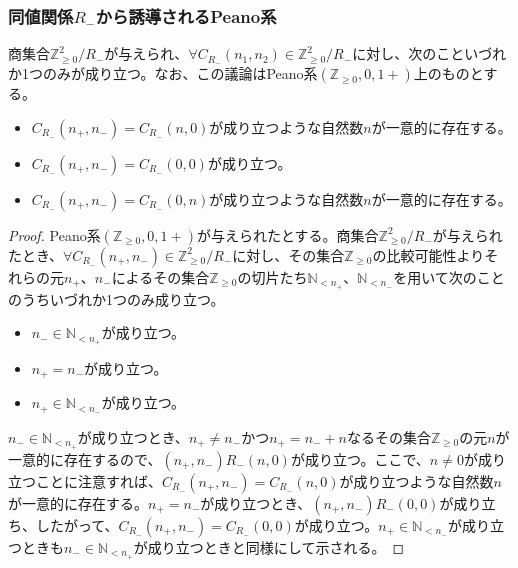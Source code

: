 \documentclass[dvipdfmx]{jsarticle}
\begin{document}
\subsubsection{同値関係$R_{-}$から誘導されるPeano系}%
\begin{thm}\label{1.2.6.2}
商集合$\mathbb{Z}_{\geq 0}^{2} /R_{-} $が与えられ、$\forall C_{R_{-}}\left( n_{1},n_{2} \right) \in \mathbb{Z}_{\geq 0}^{2} /R_{-} $に対し、次のこといづれか1つのみが成り立つ。なお、この議論はPeano系$\left( \mathbb{Z}_{\geq 0},0,1 + \right)$上のものとする。
\begin{itemize}
\item
  $C_{R_{-}}\left( n_{+},n_{-} \right) = C_{R_{-}}(n,0)$が成り立つような自然数$n$が一意的に存在する。
\item
  $C_{R_{-}}\left( n_{+},n_{-} \right) = C_{R_{-}}(0,0)$が成り立つ。
\item
  $C_{R_{-}}\left( n_{+},n_{-} \right) = C_{R_{-}}(0,n)$が成り立つような自然数$n$が一意的に存在する。
\end{itemize}
\end{thm}
\begin{proof}
Peano系$\left( \mathbb{Z}_{\geq 0},0,1 + \right)$が与えられたとする。商集合$\mathbb{Z}_{\geq 0}^{2} /R_{-} $が与えられたとき、$\forall C_{R_{-}}\left( n_{+},n_{-} \right) \in \mathbb{Z}_{\geq 0}^{2} /R_{-} $に対し、その集合$\mathbb{Z}_{\geq 0}$の比較可能性よりそれらの元$n_{+}$、$n_{-}$によるその集合$\mathbb{Z}_{\geq 0}$の切片たち$\mathbb{N}_{< n_{+}}$、$\mathbb{N}_{< n_{-}}$を用いて次のことのうちいづれか1つのみ成り立つ。
\begin{itemize}
\item
  $n_{-} \in \mathbb{N}_{< n_{+}}$が成り立つ。
\item
  $n_{+} = n_{-}$が成り立つ。
\item
  $n_{+} \in \mathbb{N}_{< n_{-}}$が成り立つ。
\end{itemize}
$n_{-} \in \mathbb{N}_{< n_{+}}$が成り立つとき、$n_{+} \neq n_{-}$かつ$n_{+} = n_{-} + n$なるその集合$\mathbb{Z}_{\geq 0}$の元$n$が一意的に存在するので、$\left( n_{+},n_{-} \right)R_{-}(n,0)$が成り立つ。ここで、$n \neq 0$が成り立つことに注意すれば、$C_{R_{-}}\left( n_{+},n_{-} \right) = C_{R_{-}}(n,0)$が成り立つような自然数$n$が一意的に存在する。$n_{+} = n_{-}$が成り立つとき、$\left( n_{+},n_{-} \right)R_{-}(0,0)$が成り立ち、したがって、$C_{R_{-}}\left( n_{+},n_{-} \right) = C_{R_{-}}(0,0)$が成り立つ。$n_{+} \in \mathbb{N}_{< n_{-}}$が成り立つときも$n_{-} \in \mathbb{N}_{< n_{+}}$が成り立つときと同様にして示される。
\end{proof}
\end{document}
